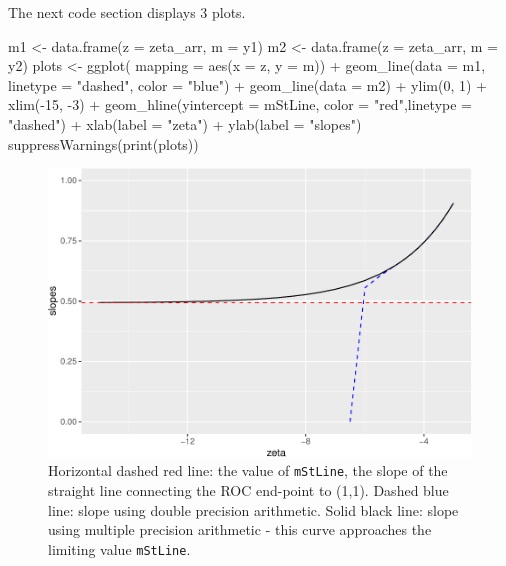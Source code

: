 \documentclass[
]{book}
\newenvironment{Shaded}{\begin{snugshade}}{\end{snugshade}}
\newcommand{\AttributeTok}[1]{\textcolor[rgb]{0.77,0.63,0.00}{#1}}
\newcommand{\DecValTok}[1]{\textcolor[rgb]{0.00,0.00,0.81}{#1}}
\newcommand{\FunctionTok}[1]{\textcolor[rgb]{0.00,0.00,0.00}{#1}}
\newcommand{\NormalTok}[1]{#1}
\newcommand{\OtherTok}[1]{\textcolor[rgb]{0.56,0.35,0.01}{#1}}
\newcommand{\SpecialCharTok}[1]{\textcolor[rgb]{0.00,0.00,0.00}{#1}}
\newcommand{\StringTok}[1]{\textcolor[rgb]{0.31,0.60,0.02}{#1}}
\begin{document}
The next code section displays 3 plots.

\begin{Shaded}
\begin{Highlighting}[]
\NormalTok{m1 }\OtherTok{\textless{}{-}} \FunctionTok{data.frame}\NormalTok{(}\AttributeTok{z =}\NormalTok{ zeta\_arr, }\AttributeTok{m =}\NormalTok{ y1)}
\NormalTok{m2 }\OtherTok{\textless{}{-}} \FunctionTok{data.frame}\NormalTok{(}\AttributeTok{z =}\NormalTok{ zeta\_arr, }\AttributeTok{m =}\NormalTok{ y2)}
\NormalTok{plots }\OtherTok{\textless{}{-}} \FunctionTok{ggplot}\NormalTok{(}
  \AttributeTok{mapping =} \FunctionTok{aes}\NormalTok{(}\AttributeTok{x =}\NormalTok{ z, }\AttributeTok{y =}\NormalTok{ m)) }\SpecialCharTok{+} 
  \FunctionTok{geom\_line}\NormalTok{(}\AttributeTok{data =}\NormalTok{ m1, }\AttributeTok{linetype =} \StringTok{"dashed"}\NormalTok{, }\AttributeTok{color =} \StringTok{"blue"}\NormalTok{) }\SpecialCharTok{+} 
  \FunctionTok{geom\_line}\NormalTok{(}\AttributeTok{data =}\NormalTok{ m2) }\SpecialCharTok{+}
  \FunctionTok{ylim}\NormalTok{(}\DecValTok{0}\NormalTok{, }\DecValTok{1}\NormalTok{) }\SpecialCharTok{+} \FunctionTok{xlim}\NormalTok{(}\SpecialCharTok{{-}}\DecValTok{15}\NormalTok{, }\SpecialCharTok{{-}}\DecValTok{3}\NormalTok{) }\SpecialCharTok{+} 
  \FunctionTok{geom\_hline}\NormalTok{(}\AttributeTok{yintercept =}\NormalTok{ mStLine, }\AttributeTok{color =} \StringTok{"red"}\NormalTok{,}\AttributeTok{linetype =} \StringTok{"dashed"}\NormalTok{) }\SpecialCharTok{+} 
  \FunctionTok{xlab}\NormalTok{(}\AttributeTok{label =} \StringTok{"zeta"}\NormalTok{) }\SpecialCharTok{+} \FunctionTok{ylab}\NormalTok{(}\AttributeTok{label =} \StringTok{"slopes"}\NormalTok{)}
\FunctionTok{suppressWarnings}\NormalTok{(}\FunctionTok{print}\NormalTok{(plots))}
\end{Highlighting}
\end{Shaded}

\begin{figure}
\centering
\includegraphics{17a-rsm-predictions_files/figure-latex/rsm-pred-plots1-1.pdf}
\caption{\label{fig:rsm-pred-plots1}Horizontal dashed red line: the value of \texttt{mStLine}, the slope of the straight line connecting the ROC end-point to (1,1). Dashed blue line: slope using double precision arithmetic. Solid black line: slope using multiple precision arithmetic - this curve approaches the limiting value \texttt{mStLine}.}
\end{figure}
\end{document}
